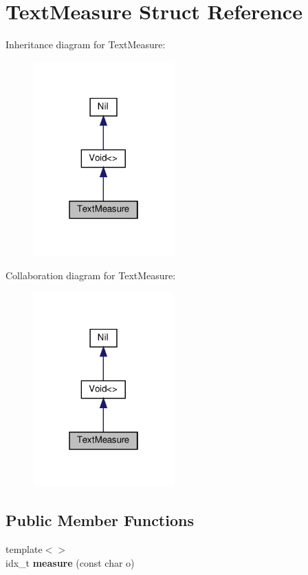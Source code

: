 \hypertarget{structTextMeasure}{}\section{Text\+Measure Struct Reference}
\label{structTextMeasure}


Inheritance diagram for Text\+Measure\+:\nopagebreak
\begin{figure}[H]
\begin{center}
\leavevmode
\includegraphics[width=154pt]{structTextMeasure__inherit__graph}
\end{center}
\end{figure}


Collaboration diagram for Text\+Measure\+:\nopagebreak
\begin{figure}[H]
\begin{center}
\leavevmode
\includegraphics[width=154pt]{structTextMeasure__coll__graph}
\end{center}
\end{figure}
\subsection*{Public Member Functions}
\begin{DoxyCompactItemize}
\item 
\mbox{\label{structTextMeasure_a7246afe4918a8992472cdbeba3e749e6}} 
{\footnotesize template$<$$>$ }\\idx\+\_\+t {\bfseries measure} (const char o)
\end{DoxyCompactItemize}
